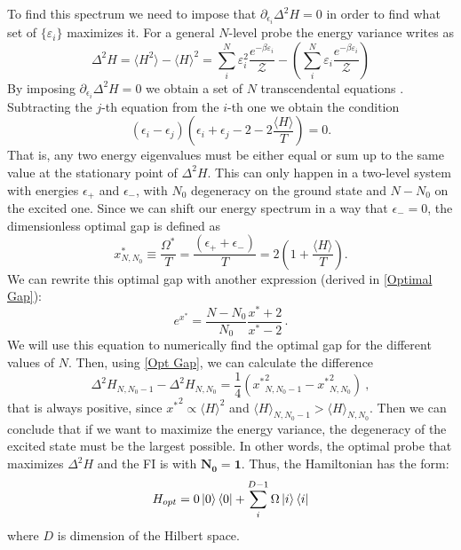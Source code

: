 To find this spectrum we need to impose that $\partial_{\epsilon_i}\Delta^2 H=0$ in order to find what set of $\{ \varepsilon_i\}$ maximizes it. For a general $N$-level probe the energy variance writes as
\begin{equation}\label{Energy Variance}
    \Delta^2 H=\langle H^2\rangle - \langle H \rangle^2=\sum_i^N\varepsilon_i^2 \frac{e^{-\beta\varepsilon_i}}{\mathcal{Z}}-\left(\sum_i^N\varepsilon_i\frac{e^{-\beta\varepsilon_i}}{\mathcal{Z}}\right)
\end{equation}
By imposing  $\partial_{\epsilon_i}\Delta^2 H=0$ we obtain a set of $N$ transcendental equations \cite{SupplementalCorrea2015}. Subtracting the $j$-th equation from the $i$-th one we obtain the condition
\begin{equation}
(\epsilon_i-\epsilon_j)\left(\epsilon_i+\epsilon_j-2-2\frac{\langle H \rangle}{T}\right) = 0.
\end{equation}
That is, any two energy eigenvalues must be either equal or sum up to the same value at the stationary point of $\Delta^2 H$. This can only happen in a two-level system with energies $\epsilon_+$ and $\epsilon_-$, with $N_0$ degeneracy on the ground state and $N - N_0$ on the excited one.
Since we can shift our energy spectrum in a way that $\epsilon_-=0$, the dimensionless optimal gap is defined as
\begin{equation}\label{Opt Gap}
   x^*_{N,N_0}\equiv\frac{\Omega^*}{T}=\frac{(\epsilon_++\epsilon_-)}{T}=2\left(1+\frac{\langle H \rangle}{T}\right). 
\end{equation}
We can rewrite this optimal gap with another expression (derived in \ref{Optimal Gap}):
\begin{equation}
    e^{x^*}=\frac{N-N_0}{N_0}\frac{x^*+2}{x^*-2} \, .
    \label{e^x}
\end{equation}
We will use this equation to numerically find the optimal gap for the different values of $N$. Then, using \eqref{Opt Gap}, we can calculate the difference \cite{correa2015individual}
\begin{equation}
    \Delta^2 H_{N,N_0-1}-\Delta^2 H_{N,N_0}=\frac{1}{4}({x^*}^2_{N,N_0-1}-{x^*}^2_{N,N_0})\ ,
\end{equation}
that is always positive, since ${x^*}^2\propto \langle H \rangle^2$ and $\langle H \rangle_{N,N_0-1}>\langle H \rangle_{N,N_0}$. Then we can conclude that if we want to maximize the energy variance, the degeneracy of the excited state must be the largest possible. In other words, the optimal probe that maximizes $\Delta^2 H$ and the FI is with $\mathbf{N_0=1}$. Thus, the Hamiltonian has the form:
\begin{equation}
    H_{opt} = 0\ket{0}\bra{0} +\sum_i^{D-1}\Omega\ket{i}\bra{i}
    \label{Hopt}
\end{equation}
where $D$ is dimension of the Hilbert space.

